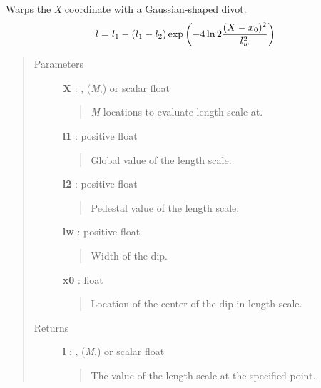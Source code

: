 \documentclass[letterpaper,10pt,english]{sphinxmanual}
\begin{document}

\begin{fulllineitems}
\label{gptools.kernel:gptools.kernel.gibbs.gauss_warp_arb}
Warps the \emph{X} coordinate with a Gaussian-shaped divot.
\begin{gather}
\begin{split}l = l_1 - (l_1 - l_2) \exp\left ( -4\ln 2\frac{(X-x_0)^2}{l_{w}^{2}} \right )\end{split}\notag
\end{gather}\begin{quote}\begin{description}
\item[{Parameters}] \leavevmode
\textbf{X} : , (\emph{M},) or scalar float
\begin{quote}

\emph{M} locations to evaluate length scale at.
\end{quote}

\textbf{l1} : positive float
\begin{quote}

Global value of the length scale.
\end{quote}

\textbf{l2} : positive float
\begin{quote}

Pedestal value of the length scale.
\end{quote}

\textbf{lw} : positive float
\begin{quote}

Width of the dip.
\end{quote}

\textbf{x0} : float
\begin{quote}

Location of the center of the dip in length scale.
\end{quote}

\item[{Returns}] \leavevmode
\textbf{l} : , (\emph{M},) or scalar float
\begin{quote}

The value of the length scale at the specified point.
\end{quote}

\end{description}\end{quote}

\end{fulllineitems}
\end{document}
